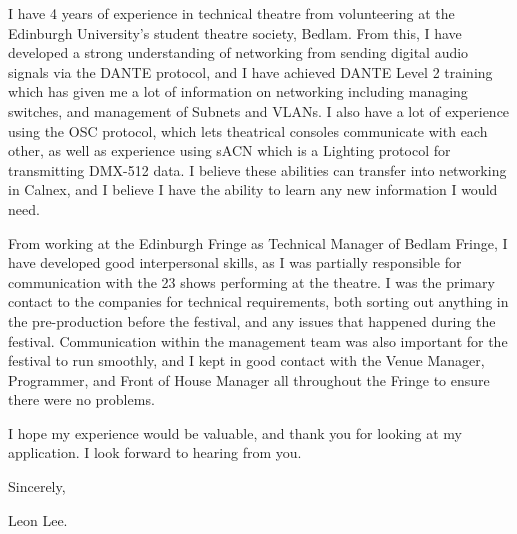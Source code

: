 \documentclass[10pt,english]{article}
\begin{document}
\medskip

I have 4 years of experience in technical theatre from volunteering at the Edinburgh University's student theatre society, Bedlam. From this, I have developed a strong understanding of networking from sending digital audio signals via the DANTE protocol, and I have achieved DANTE Level 2 training which has given me a lot of information on networking including managing switches, and management of Subnets and VLANs. I also have a lot of experience using the OSC protocol, which lets theatrical consoles communicate with each other, as well as experience using sACN which is a Lighting protocol for transmitting DMX-512 data. I believe these abilities can transfer into networking in Calnex, and I believe I have the ability to learn any new information I would need.
\medskip

From working at the Edinburgh Fringe as Technical Manager of Bedlam Fringe, I have developed good interpersonal skills, as I was partially responsible for communication with the 23 shows performing at the theatre. I was the primary contact to the companies for technical requirements, both sorting out anything in the pre-production before the festival, and any issues that happened during the festival. Communication within the management team was also important for the festival to run smoothly, and I kept in good contact with the Venue Manager, Programmer, and Front of House Manager all throughout the Fringe to ensure there were no problems.

\medskip

I hope my experience would be valuable, and thank you for looking at my application. I look forward to hearing from you.
\medskip

Sincerely,

Leon Lee.
\end{document}
